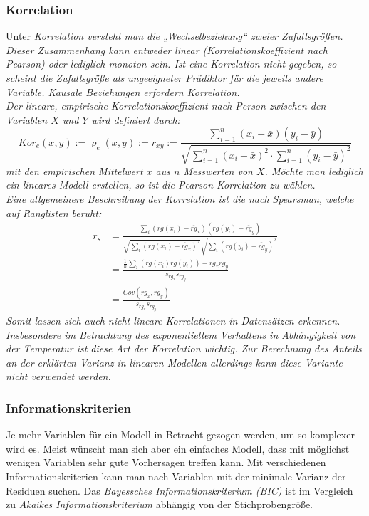 \subsubsection{Korrelation}
Unter \it{Korrelation} versteht man die „Wechselbeziehung“ zweier Zufallsgrößen.
Dieser Zusammenhang kann entweder \it{linear} (Korrelationskoeffizient nach Pearson) oder lediglich \it{monoton} sein.
Ist eine Korrelation nicht gegeben, so scheint die Zufallsgröße als ungeeigneter Prädiktor für die jeweils andere Variable.
Kausale Beziehungen erfordern Korrelation.
\\
Der \it{lineare, empirische Korrelationskoeffizient nach Person} zwischen den Variablen $X$ und $Y$ wird definiert durch:
\begin{equation}
	Kor_e(x,y) := \varrho_e(x,y) := r_{xy} := \frac{
		\sum_{i=1}^n(x_i-\bar x)(y_i-\bar y)
	}{
	\sqrt{
		\sum_{i=1}^n(x_i-\bar x)^2\cdot
		\sum_{i=1}^n(y_i-\bar y)^2
	}
	}
\end{equation}
mit den empirischen Mittelwert $\bar x$ aus $n$ Messwerten von $X$.
Möchte man lediglich ein \it{lineares} Modell erstellen, so ist die Pearson-Korrelation zu wählen.
\\
Eine allgemeinere Beschreibung der Korrelation ist die nach \it{Spearsman}, welche auf Ranglisten beruht:\\
\begin{align}
	r_s &= \frac{\sum_{i}(rg(x_i)-\overline{rg}_x)(rg(y_i)-\overline{rg}_y)} {\sqrt{\sum_{i}(rg(x_i)-\overline{rg}_x) ^2}\sqrt{\sum_{i}(rg(y_i)-\overline{rg}_y)^2}}\\
	&= \frac { \frac{1}{n} \sum_{i}(rg(x_{i})  rg(y_{i})) - \overline{rg_x rg_y}  }{s_{rg_x} s_{rg_y}} \\
	&= \frac {{Cov}(rg_{x},rg_{y} )} { s_{rg_x} s_{rg_y} }
\end{align}
Somit lassen sich auch nicht-lineare Korrelationen in Datensätzen erkennen.
Insbesondere im Betrachtung des exponentiellem Verhaltens in Abhängigkeit von der Temperatur ist diese Art der Korrelation wichtig.
Zur Berechnung des Anteils an der \it{erklärten} Varianz in linearen Modellen allerdings kann diese Variante nicht verwendet werden.

\subsubsection{Informationskriterien}

Je mehr Variablen für ein Modell in Betracht gezogen werden, um so komplexer wird es. Meist wünscht man sich aber ein einfaches Modell, dass mit möglichst wenigen Variablen sehr gute Vorhersagen treffen kann. Mit verschiedenen Informationskriterien kann man nach Variablen mit der minimale Varianz der Residuen suchen. Das \emph{Bayessches Informationskriterium (BIC)} ist im Vergleich zu \emph{Akaikes Informationskriterium} abhängig von der Stichprobengröße.


